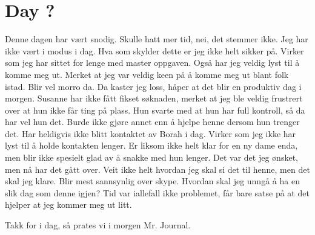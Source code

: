 \section{Day ?}
Denne dagen har vært snodig. 
Skulle hatt mer tid, nei, det stemmer ikke.
Jeg har ikke vært i modus i dag. 
Hva som skylder dette er jeg ikke helt sikker på.
Virker som jeg har sittet for lenge med master oppgaven. 
Også har jeg veldig lyst til å komme meg ut.
Merket at jeg var veldig keen på å komme meg ut blant folk istad.
Blir vel morro da.
Da kaster jeg loss, håper at det blir en produktiv dag i morgen.
Susanne har ikke fått fikset søknaden, merket at jeg ble veldig frustrert over at hun ikke får ting på plass. 
Hun svarte med at hun har full kontroll, så da har vel hun det.
Burde ikke gjøre annet enn å hjelpe henne dersom hun trenger det.
Har heldigvis ikke blitt kontaktet av Borah i dag.
Virker som jeg ikke har lyst til å holde kontakten lenger. 
Er liksom ikke helt klar for en ny dame enda, men blir ikke spesielt glad av å snakke med hun lenger.
Det var det jeg ønsket, men nå har det gått over.
Veit ikke helt hvordan jeg skal si det til henne, men det skal jeg klare. 
Blir mest sannsynlig over skype.
Hvordan skal jeg unngå å ha en slik dag som denne igjen?
Tid var iallefall ikke problemet, får bare satse på at det hjelper at jeg kommer meg ut litt.

Takk for i dag, så prates vi i morgen Mr. Journal.

